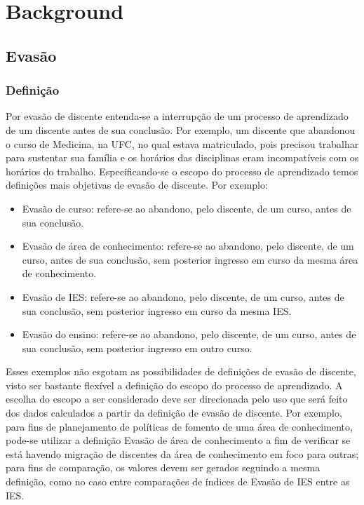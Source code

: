 \documentclass{report}
\begin{document}
\listoftodos

\tableofcontents

\chapter{Background}

\section{Evasão}
\cite{esclarecimentos_calculos}
\cite{mudanca_calculos}

\subsection{Definição}
Por evasão de discente entenda-se a interrupção de um processo de aprendizado de um discente antes de sua conclusão. Por exemplo, um discente que abandonou o curso de Medicina, na UFC, no qual estava matriculado, pois precisou trabalhar para sustentar sua família e os horários das disciplinas eram incompatíveis com os horários do trabalho. Especificando-se o escopo do processo de aprendizado temos definições mais objetivas de evasão de discente. Por exemplo:
\begin{itemize}
\item Evasão de curso: refere-se ao abandono, pelo discente, de um curso, antes de sua conclusão.
\item Evasão de área de conhecimento: refere-se ao abandono, pelo discente, de um curso, antes de sua conclusão, sem posterior ingresso em curso da mesma área de conhecimento.
\item Evasão de IES: refere-se ao abandono, pelo discente, de um curso, antes de sua conclusão, sem posterior ingresso em curso da mesma IES. 
\item Evasão do ensino: refere-se ao abandono, pelo discente, de um curso, antes de sua conclusão, sem posterior ingresso em outro curso.
\end{itemize}

Esses exemplos não esgotam as possibilidades de definições de evasão de discente, visto ser bastante flexível a definição do escopo do processo de aprendizado. A escolha do escopo a ser considerado deve ser direcionada pelo uso que será feito dos dados calculados a partir da definição de evasão de discente. Por exemplo, para fins de planejamento de políticas de fomento de uma área de conhecimento, pode-se utilizar a definição Evasão de área de conhecimento a fim de verificar se está havendo migração de discentes da área de conhecimento em foco para outras; para fins de comparação, os valores devem ser gerados seguindo a mesma definição, como no caso entre comparações de índices de Evasão de IES entre as IES.
\end{document}
